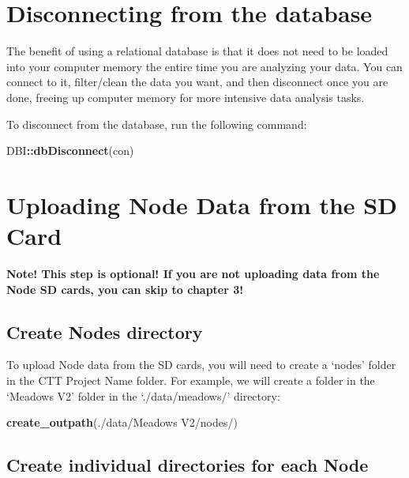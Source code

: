 \documentclass[
]{book}
\newenvironment{Shaded}{\begin{snugshade}}{\end{snugshade}}
\newcommand{\FunctionTok}[1]{\textcolor[rgb]{0.13,0.29,0.53}{\textbf{#1}}}
\newcommand{\NormalTok}[1]{#1}
\newcommand{\SpecialCharTok}[1]{\textcolor[rgb]{0.81,0.36,0.00}{\textbf{#1}}}
\newcommand{\StringTok}[1]{\textcolor[rgb]{0.31,0.60,0.02}{#1}}
\begin{document}
\section{Disconnecting from the database}\label{disconnecting-from-the-database}

The benefit of using a relational database is that it does not need to be loaded into your computer memory the entire time you are analyzing your data. You can connect to it, filter/clean the data you want, and then disconnect once you are done, freeing up computer memory for more intensive data analysis tasks.

To disconnect from the database, run the following command:

\begin{Shaded}
\begin{Highlighting}[]
\NormalTok{DBI}\SpecialCharTok{::}\FunctionTok{dbDisconnect}\NormalTok{(con)}
\end{Highlighting}
\end{Shaded}

\section{Uploading Node Data from the SD Card}\label{uploading-node-data-from-the-sd-card}

\textbf{Note! This step is optional! If you are not uploading data from the Node SD cards, you can skip to chapter 3!}

\subsection{Create Nodes directory}\label{create-nodes-directory}

To upload Node data from the SD cards, you will need to create a `nodes' folder in the CTT Project Name folder. For example, we will create a folder in the `Meadows V2' folder in the `./data/meadows/' directory:

\begin{Shaded}
\begin{Highlighting}[]
\FunctionTok{create\_outpath}\NormalTok{(}\StringTok{\textquotesingle{}./data/Meadows V2/nodes/\textquotesingle{}}\NormalTok{)}
\end{Highlighting}
\end{Shaded}

\subsection{Create individual directories for each Node}\label{create-individual-directories-for-each-node}
\end{document}
